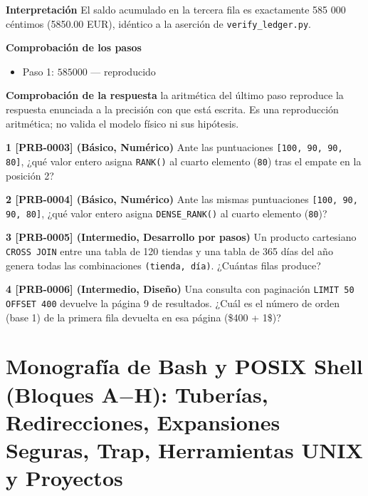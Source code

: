 \documentclass{book}
\begin{document}
\begin{tcolorbox}[title={Problema resuelto}, studiumworked, breakable]
\noindent\textbf{Interpretación}
El saldo acumulado en la tercera fila es exactamente 585 000 céntimos (5850.00 EUR), idéntico a la aserción de \texttt{verify\_ledger.py}.

\noindent\textbf{Comprobación de los pasos}
\begin{itemize}
\item Paso 1: $585000$ — reproducido
\end{itemize}

\noindent\textbf{Comprobación de la respuesta} la aritmética del último paso reproduce la respuesta enunciada a la precisión con que está escrita. Es una reproducción aritmética; no valida el modelo físico ni sus hipótesis.
\end{tcolorbox}

\begin{tcolorbox}[title={Ejercicios}, studiumworked, breakable]

\noindent\textbf{1 [PRB-0003] (Básico, Numérico)}
Ante las puntuaciones \texttt{[100, 90, 90, 80]}, ¿qué valor entero asigna \texttt{RANK()} al cuarto elemento (\texttt{80}) tras el empate en la posición 2?

\noindent\textbf{2 [PRB-0004] (Básico, Numérico)}
Ante las mismas puntuaciones \texttt{[100, 90, 90, 80]}, ¿qué valor entero asigna \texttt{DENSE\_RANK()} al cuarto elemento (\texttt{80})?

\noindent\textbf{3 [PRB-0005] (Intermedio, Desarrollo por pasos)}
Un producto cartesiano \texttt{CROSS JOIN} entre una tabla de 120 tiendas y una tabla de 365 días del año genera todas las combinaciones \texttt{(tienda, d{\'i}a)}. ¿Cuántas filas produce?

\noindent\textbf{4 [PRB-0006] (Intermedio, Diseño)}
Una consulta con paginación \texttt{LIMIT 50 OFFSET 400} devuelve la página 9 de resultados. ¿Cuál es el número de orden (base 1) de la primera fila devuelta en esa página (\$400 + 1\$)?
\end{tcolorbox}

\chapter{Monografía de Bash y POSIX Shell (Bloques A\(-\)H): Tuberías, Redirecciones, Expansiones Seguras, Trap, Herramientas UNIX y Proyectos}
\label{chap:cap02-monografia-bash-posix-shell-automatizacion-sistemas}
\end{document}
